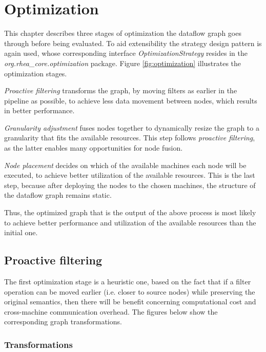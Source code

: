 \documentclass[sigplan,review,anonymous]{acmart}\settopmatter{printfolios=true}
\begin{document}
\section{Optimization}

This chapter describes three stages of optimization the dataflow graph goes through before being evaluated. To aid extensibility  the strategy design pattern is again used, whose corresponding interface \textit{OptimizationStrategy} resides in the \textit{org.rhea\_core.optimization} package. Figure \ref{fig:optimization} illustrates the optimization stages.


\textit{Proactive filtering} transforms the graph, by moving filters as earlier in the pipeline as possible, to achieve less data movement between nodes, which results in better performance.

\textit{Granularity adjustment} fuses nodes together to dynamically resize the graph to a granularity that fits the available resources. This step follows \textit{proactive filtering}, as the latter enables many opportunities for node fusion.

\textit{Node placement} decides on which of the available machines each node will be executed, to achieve better utilization of the available resources. This is the last step, because after deploying the nodes to the chosen machines, the structure of the dataflow graph remains static.

Thus, the optimized graph that is the output of the above process is most likely to achieve better performance and utilization of the available resources than the initial one.

\subsection{Proactive filtering}

The first optimization stage is a heuristic one, based on the fact that if a filter operation can be moved earlier (i.e. closer to source nodes) while preserving the original semantics, then there will be benefit concerning computational cost and cross-machine communication overhead. The figures below show the corresponding graph transformations.

\subsubsection{Transformations}
\end{document}
